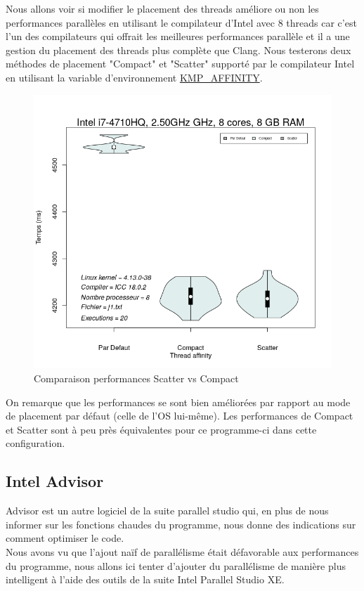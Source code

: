 \documentclass[
 aip,
 jmp,
 amsmath,amssymb,
 reprint
]{revtex4-1}
\begin{document}
Nous allons voir si modifier le placement des threads améliore ou non les performances parallèles en utilisant le compilateur d'Intel avec 8 threads car c'est l'un des compilateurs qui offrait les meilleures performances parallèle et il a une gestion du placement des threads plus complète que Clang. Nous testerons deux méthodes de placement "Compact" et "Scatter" supporté par le compilateur Intel en utilisant la variable d'environnement \href{https://software.intel.com/en-us/node/522691}{KMP\_AFFINITY}.

\begin{figure}[H]
  \includegraphics[width=\linewidth, keepaspectratio=true]{defaultVSscatterVScompact.png}
  \caption{Comparaison performances Scatter vs Compact\label{Fig:scatter_vs_compact}}
\end{figure}

On remarque que les performances se sont bien améliorées par rapport au mode de placement par défaut (celle de l'OS lui-même). Les performances de Compact et Scatter sont à peu près équivalentes pour ce programme-ci dans cette configuration.

\subsection{Intel Advisor}

Advisor est un autre logiciel de la suite parallel studio qui, en plus de nous informer sur les fonctions chaudes du programme, nous donne des indications sur comment optimiser le code.\\
Nous avons vu que l'ajout naïf de parallélisme était défavorable aux performances du programme, nous allons ici tenter d'ajouter du parallélisme de manière plus intelligent à l'aide des outils de la suite Intel Parallel Studio XE.
\end{document}
